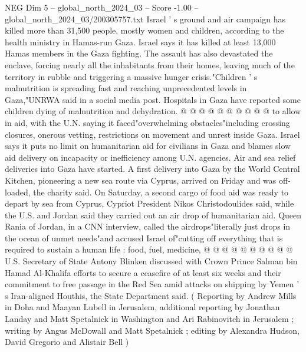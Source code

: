 \begin{textsample}{NEG Dim 5 – global\_north\_2024\_03 – Score -1.00 – global\_north\_2024\_03/200305757.txt}
Israel ' s ground and air campaign has killed more than 31,500 people, mostly women and children, according to the health ministry in Hamas-run Gaza.
Israel says it has killed at least 13,000 Hamas members in the Gaza fighting.
The assault has also devastated the enclave, forcing nearly all the inhabitants from their homes, leaving much of the territory in rubble and triggering a massive hunger crisis."Children ' s malnutrition is spreading fast and reaching unprecedented levels in Gaza,"UNRWA said in a social media post.
Hospitals in Gaza have reported some children dying of malnutrition and dehydration. @ @ @ @ @ @ @ @ @ @ to allow in aid, with the U.N. saying it faced"overwhelming obstacles"including crossing closures, onerous vetting, restrictions on movement and unrest inside Gaza.
Israel says it puts no limit on humanitarian aid for civilians in Gaza and blames slow aid delivery on incapacity or inefficiency among U.N. agencies.
Air and sea relief deliveries into Gaza have started.
A first delivery into Gaza by the World Central Kitchen, pioneering a new sea route via Cyprus, arrived on Friday and was off-loaded, the charity said.
On Saturday, a second cargo of food aid was ready to depart by sea from Cyprus, Cypriot President Nikos Christodoulides said, while the U.S. and Jordan said they carried out an air drop of humanitarian aid.
Queen Rania of Jordan, in a CNN interview, called the airdrops"literally just drops in the ocean of unmet needs"and accused Israel of"cutting off everything that is required to sustain a human life : food, fuel, medicine, @ @ @ @ @ @ @ @ @ @ U.S.
Secretary of State Antony Blinken discussed with Crown Prince Salman bin Hamad Al-Khalifa efforts to secure a ceasefire of at least six weeks and their commitment to free passage in the Red Sea amid attacks on shipping by Yemen ' s Iran-aligned Houthis, the State Department said. ( Reporting by Andrew Mills in Doha and Maayan Lubell in Jerusalem, additional reporting by Jonathan Landay and Matt Spetalnick in Washington and Ari Rabinovitch in Jerusalem ; writing by Angus McDowall and Matt Spetalnick ; editing by Alexandra Hudson, David Gregorio and Alistair Bell )

\end{textsample}
